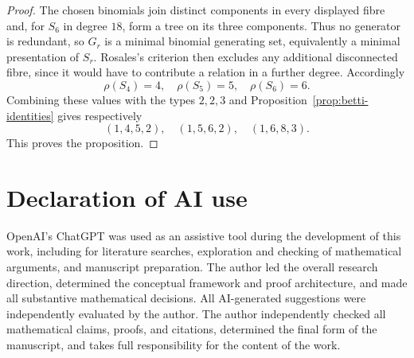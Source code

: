 \documentclass[10pt]{amsart}
\theoremstyle{plain}
\begin{document}
\begin{proof}
The chosen binomials join distinct components in every displayed fibre and,
for \(S_6\) in degree \(18\), form a tree on its three components.  Thus no
generator is redundant, so \(G_r\) is a minimal binomial generating set,
equivalently a minimal presentation of \(S_r\).  Rosales's criterion then
excludes any additional disconnected fibre, since it would have to
contribute a relation in a further degree.  Accordingly
\[
\rho(S_4)=4,\quad \rho(S_5)=5,\quad \rho(S_6)=6.
\]
Combining these values with the types \(2,2,3\) and
Proposition~\ref{prop:betti-identities} gives respectively
\[
(1,4,5,2),\quad (1,5,6,2),\quad (1,6,8,3).
\]
This proves the proposition.
\end{proof}

\section*{Declaration of AI use}

OpenAI's ChatGPT was used as an assistive tool during the development of this
work, including for literature searches, exploration and checking of mathematical
arguments, and manuscript preparation. The author led the overall research
direction, determined the conceptual framework and proof architecture, and made
all substantive mathematical decisions. All AI-generated suggestions were
independently evaluated by the author. The author independently checked all
mathematical claims, proofs, and citations, determined the final form of the
manuscript, and takes full responsibility for the content of the work.
\end{document}
